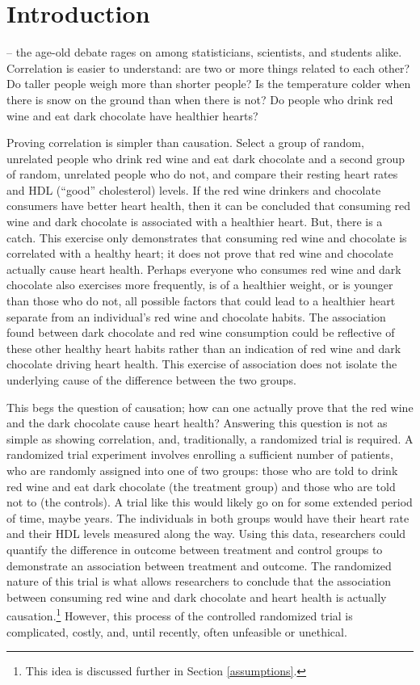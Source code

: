 \chapter{Introduction}
\label{introduction}

 -- the age-old debate rages on among statisticians, scientists, and students alike.  Correlation is easier to understand: are two or more things related to each other?  Do taller people weigh more than shorter people?  Is the temperature colder when there is snow on the ground than when there is not?  Do people who drink red wine and eat dark chocolate have healthier hearts? 

Proving correlation is simpler than causation.  Select a group of random, unrelated people who drink red wine and eat dark chocolate and a second group of random, unrelated people who do not, and compare their resting heart rates and HDL (``good'' cholesterol) levels.  If the red wine drinkers and chocolate consumers have better heart health, then it can be concluded that consuming red wine and dark chocolate is associated with a healthier heart.  But, there is a catch.  This exercise only demonstrates that consuming red wine and chocolate is correlated with a healthy heart; it does not prove that red wine and chocolate actually cause heart health.  Perhaps everyone who consumes red wine and dark chocolate also exercises more frequently, is of a healthier weight, or is younger than those who do not, all possible factors that could lead to a healthier heart separate from an individual's red wine and chocolate habits.  The association found between dark chocolate and red wine consumption could be reflective of these other healthy heart habits rather than an indication of red wine and dark chocolate driving heart health.  This exercise of association does not isolate the underlying cause of the difference between the two groups. 
 
This begs the question of causation; how can one actually prove that the red wine and the dark chocolate cause heart health?  Answering this question is not as simple as showing correlation, and, traditionally, a randomized trial is required.  A randomized trial experiment involves enrolling a sufficient number of patients, who are randomly assigned into one of two groups: those who are told to drink red wine and eat dark chocolate (the treatment group) and those who are told not to (the controls).  A trial like this would likely go on for some extended period of time, maybe years.  The individuals in both groups would have their heart rate and their HDL levels measured along the way.  Using this data, researchers could quantify the difference in outcome between treatment and control groups to demonstrate an association between treatment and outcome.  The randomized nature of this trial is what allows researchers to conclude that the association between consuming red wine and dark chocolate and heart health is actually causation.\footnote{This idea is discussed further in Section \ref{assumptions}.} However, this process of the controlled randomized trial is complicated, costly, and, until recently, often unfeasible or unethical.  
 
